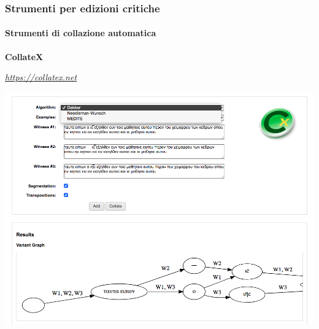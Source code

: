 

\begin{frame}
    \frametitle{Strumenti per edizioni critiche}
    \framesubtitle{Strumenti di collazione automatica}
	\addtocounter{nframe}{1}
    \begin{center}
        \textbf{CollateX}
    \end{center}
    \begin{center}
        \textit{\url{https://collatex.net}}
	\end{center}
    \begin{center}
        \includegraphics[width=.95\textwidth]{imgs/collatex.png}
	\end{center}
\end{frame}

